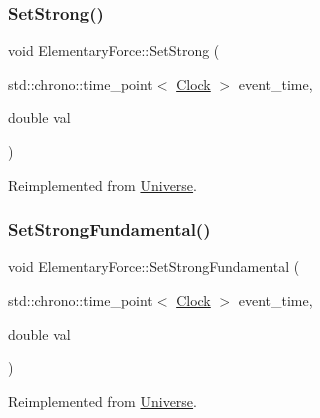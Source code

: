 \subsubsection{\texorpdfstring{Set\+Strong()}{SetStrong()}}
{\footnotesize\ttfamily void Elementary\+Force\+::\+Set\+Strong (\begin{DoxyParamCaption}\item[{std\+::chrono\+::time\+\_\+point$<$ \mbox{\hyperlink{universe_8h_a0ef8d951d1ca5ab3cfaf7ab4c7a6fd80}{Clock}} $>$}]{event\+\_\+time,  }\item[{double}]{val }\end{DoxyParamCaption})\hspace{0.3cm}{\ttfamily [virtual]}}



Reimplemented from \mbox{\hyperlink{classUniverse_a5946c8f3d4cda305f3ecd10df21a2f94}{Universe}}.

\mbox{\label{classElementaryForce_afb00e9a10ec33eeb1daefce39b0468b7}} 
\subsubsection{\texorpdfstring{Set\+Strong\+Fundamental()}{SetStrongFundamental()}}
{\footnotesize\ttfamily void Elementary\+Force\+::\+Set\+Strong\+Fundamental (\begin{DoxyParamCaption}\item[{std\+::chrono\+::time\+\_\+point$<$ \mbox{\hyperlink{universe_8h_a0ef8d951d1ca5ab3cfaf7ab4c7a6fd80}{Clock}} $>$}]{event\+\_\+time,  }\item[{double}]{val }\end{DoxyParamCaption})\hspace{0.3cm}{\ttfamily [virtual]}}



Reimplemented from \mbox{\hyperlink{classUniverse_aafec97a231126b71c73ac1258609a284}{Universe}}.

\mbox{\label{classElementaryForce_ac25021d38c1d54bf711096ab37a461f6}} 
